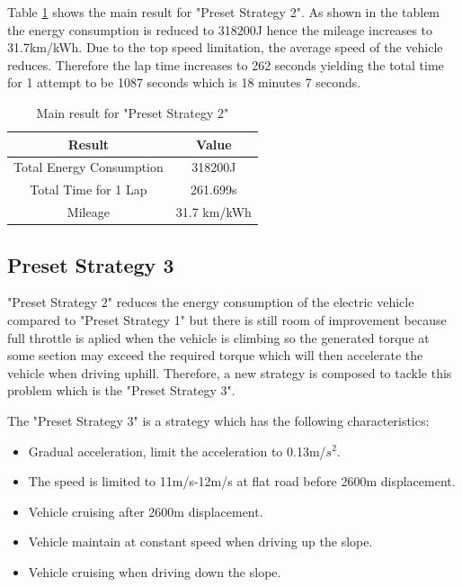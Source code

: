 Table \ref{tb:preset2Result} shows the main result for "Preset Strategy 2". As shown in the tablem the energy consumption is reduced to 318200J hence the mileage increases to 31.7km/kWh. Due to the top speed limitation, the average speed of the vehicle reduces. Therefore the lap time increases to 262 seconds yielding the total time for 1 attempt to be 1087 seconds which is 18 minutes 7 seconds. 

\begin{table}[htbp]
\begin{center}
\begin{tabular}{|c|c|}
\hline
\textbf{Result} & \textbf{Value} \\ \hline
Total Energy Consumption & 318200J \\ \hline
Total Time for 1 Lap & 261.699s \\ \hline
Mileage & 31.7 km/kWh \\ \hline
\end{tabular}
\end{center}
\caption{Main result for "Preset Strategy 2" }
\label{tb:preset2Result}
\end{table} \clearpage

\subsection{Preset Strategy 3}

"Preset Strategy 2" reduces the energy consumption of the electric vehicle compared to "Preset Strategy 1" but there is still room of improvement because full throttle is aplied when the vehicle is climbing so the generated torque at some section may exceed the required torque which will then accelerate the vehicle when driving uphill. Therefore, a new strategy is composed to tackle this problem which is the "Preset Strategy 3".

The "Preset Strategy 3" is a strategy which has the following characteristics:

\begin{itemize}
	\item{Gradual acceleration, limit the acceleration to 0.13m/$s^2$.}
	\item{The speed is limited to 11m/s-12m/s at flat road before 2600m displacement.}
	\item{Vehicle cruising after 2600m displacement.}
	\item{Vehicle maintain at constant speed when driving up the slope.}
	\item{Vehicle cruising when driving down the slope.}
\end{itemize}

